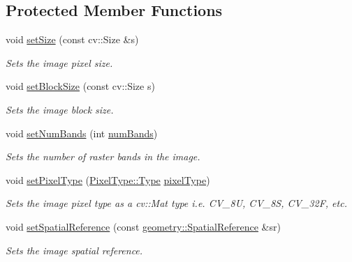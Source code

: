\subsection*{Protected Member Functions}
\begin{DoxyCompactItemize}
\item 
void \hyperlink{classdg_1_1deepcore_1_1imagery_1_1_geo_image_a9a0e4b9d11a71dabb9d36c16e1c7d902}{set\+Size} (const cv\+::\+Size \&s)
\begin{DoxyCompactList}\small\item\em Sets the image pixel size. \end{DoxyCompactList}\item 
void \hyperlink{classdg_1_1deepcore_1_1imagery_1_1_geo_image_a022e93363ae17ca78b9e9c448c043ff3}{set\+Block\+Size} (const cv\+::\+Size s)
\begin{DoxyCompactList}\small\item\em Sets the image block size. \end{DoxyCompactList}\item 
void \hyperlink{classdg_1_1deepcore_1_1imagery_1_1_geo_image_ae10a85193f3bb2a6f7099eb8ad77a229}{set\+Num\+Bands} (int \hyperlink{group___imagery_module_gabbb556d9f5048249ae32197aeb90466c}{num\+Bands})
\begin{DoxyCompactList}\small\item\em Sets the number of raster bands in the image. \end{DoxyCompactList}\item 
void \hyperlink{classdg_1_1deepcore_1_1imagery_1_1_geo_image_a7ee62bb70b471181b9be812ef64c2f9f}{set\+Pixel\+Type} (\hyperlink{namespacedg_1_1deepcore_1_1imagery_1_1_pixel_type_a5f0c62edf4601cbd15e52b381697069d}{Pixel\+Type\+::\+Type} \hyperlink{group___imagery_module_gaf5164921d6c4514a57e2aa7243e6c572}{pixel\+Type})
\begin{DoxyCompactList}\small\item\em Sets the image pixel type as a cv\+::\+Mat type i.\+e. C\+V\+\_\+8U, C\+V\+\_\+8S, C\+V\+\_\+32F, etc. \end{DoxyCompactList}\item 
void \hyperlink{classdg_1_1deepcore_1_1imagery_1_1_geo_image_a4cef7a7da7b41098ba73c280c578f183}{set\+Spatial\+Reference} (const \hyperlink{classdg_1_1deepcore_1_1geometry_1_1_spatial_reference}{geometry\+::\+Spatial\+Reference} \&sr)
\begin{DoxyCompactList}\small\item\em Sets the image spatial reference. \end{DoxyCompactList}\item 

\end{DoxyCompactItemize}
